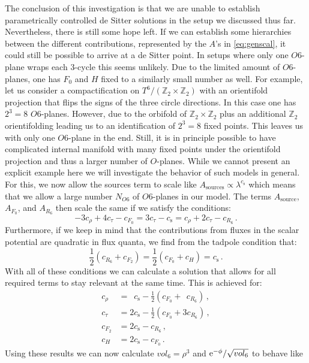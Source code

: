 \documentclass[12pt]{report}
\newcommand{\be}{\begin{equation}}
\newcommand{\ee}{\end{equation}}
\newcommand{\bea}{\begin{equation}\begin{aligned}}
\newcommand{\eea}{\end{aligned}\end{equation}}
\def\rme{{\rm e}}
\begin{document}
The conclusion of this investigation is that we are unable to establish parametrically controlled de Sitter solutions in the setup we discussed thus far. Nevertheless, there is still some hope left. If we can establish some hierarchies between the different contributions, represented by the $A$'s in \eqref{eq:genscal}, it could still be possible to arrive at a de Sitter point. In setups where only one $O6$-plane wraps each 3-cycle \cite{Danielsson:2011au} this seems unlikely. Due to the limited amount of $O6$-planes, one has $F_0$ and $H$ fixed to a similarly small number as well. For example, let us consider a compactification on $T^ 6/(\mathbb{Z}_2 \times \mathbb{Z}_2)$ with an orientifold projection that flips the signs of the three circle directions. In this case one has $2^ 3 = 8$ $O6$-planes. However, due to the orbifold of $\mathbb{Z}_2 \times \mathbb{Z}_2$ plus an additional $\mathbb{Z}_2$ orientifolding leading us to an identification of $2^ 3 = 8$ fixed points. This leaves us with only one $O6$-plane in the end. Still, it is in principle possible to have complicated internal manifold with many fixed points under the orientifold projection and thus a larger number of $O$-planes. While we cannot present an explicit example here we will investigate the behavior of such models in general. For this, we now allow the sources term to scale like $A_{\text{sources}} \propto \lambda^ {c_\text{s}}$ which means that we allow a large number $N_{O6}$ of $O6$-planes in our model. The terms $A_{\text{source}}$, $A_{F_0}$, and $A_{R_6}$ then scale the same if we satisfy the conditions:
\be 
-3 c_\rho + 4 c_\tau -c_{F_0} = 3 c_\tau - c_{\text{s}} = c_\rho + 2 c_\tau -c_{R_6}\,.
\ee
Furthermore, if we keep in mind that the contributions from fluxes in the scalar potential are quadratic in flux quanta, we find from the tadpole condition that:
\be 
\frac{1}{2} \left( c_{R_6} + c_{F_2} \right) = \frac{1}{2} \left( c_{F_0} + c_H \right) = c_{\text{s}}\,.
\ee
With all of these conditions we can calculate a solution that allows for all required terms to stay relevant at the same time. This is achieved for:
\bea 
c_\rho &= \hspace{6pt} c_{\text{s}} - \frac{1}{2} \left( c_{F_0} + \;\, c_{R_6} \right)\,,\\
c_\tau &= 2 c_{\text{s}} - \frac{1}{2} \left(c_{F_0} + 3 c_{R_6} \right)\,,\\
c_{F_2} &= 2 c_{\text{s}} - c_{R_6}\,,\\
c_{H} &= 2 c_{\text{s}} - c_{F_0}\,.
\eea
Using these results we can now calculate $vol_6 = \rho^3$ and $\rme^ {-\phi}/\sqrt{vol_6}$ to behave like
\end{document}
